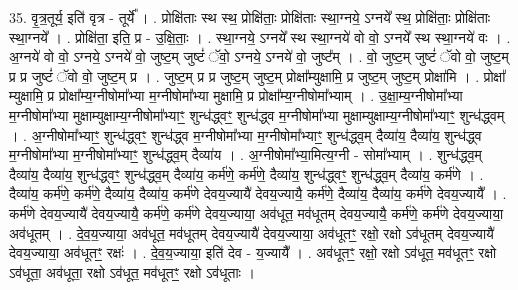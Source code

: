 \documentclass[17pt]{extarticle}
\begin{document}
35. वृ॒त्र॒तूर्य॒ इति॑ वृत्र - तूर्ये᳚ । . प्रोक्षि॑ताः स्थ स्थ॒ प्रोक्षि॑ताः॒ प्रोक्षि॑ताः स्था॒ग्नये॒ ऽग्नये᳚ स्थ॒ प्रोक्षि॑ताः॒ प्रोक्षि॑ताः स्था॒ग्नये᳚ । . प्रोक्षि॑ता॒ इति॒ प्र - उ॒क्षि॒ताः॒ । . स्था॒ग्नये॒ ऽग्नये᳚ स्थ स्था॒ग्नये॑ वो वो॒ ऽग्नये᳚ स्थ स्था॒ग्नये॑ वः । . अ॒ग्नये॑ वो वो॒ ऽग्नये॒ ऽग्नये॑ वो॒ जुष्ट॒म् जुष्टं॑ ॅवो॒ ऽग्नये॒ ऽग्नये॑ वो॒ जुष्ट᳚म् । . वो॒ जुष्ट॒म् जुष्टं॑ ॅवो वो॒ जुष्ट॒म् प्र प्र जुष्टं॑ ॅवो वो॒ जुष्ट॒म् प्र । . जुष्ट॒म् प्र प्र जुष्ट॒म् जुष्ट॒म् प्रोक्षा᳚म्युक्षामि॒ प्र जुष्ट॒म् जुष्ट॒म् प्रोक्षा॑मि । . प्रोक्षा᳚ म्युक्षामि॒ प्र प्रोक्षा᳚म्य॒ग्नीषोमा᳚भ्या म॒ग्नीषोमा᳚भ्या मुक्षामि॒ प्र प्रोक्षा᳚म्य॒ग्नीषोमा᳚भ्याम् । . उ॒क्षा॒म्य॒ग्नीषोमा᳚भ्या म॒ग्नीषोमा᳚भ्या मुक्षाम्युक्षाम्य॒ग्नीषोमा᳚भ्याꣳ॒॒ शुन्ध॑द्ध्वꣳ॒॒ 
शुन्ध॑द्ध्व म॒ग्नीषोमा᳚भ्या मुक्षाम्युक्षाम्य॒ग्नीषोमा᳚भ्याꣳ॒॒ शुन्ध॑द्ध्वम् । . अ॒ग्नीषोमा᳚भ्याꣳ॒॒ शुन्ध॑द्ध्वꣳ॒॒ शुन्ध॑द्ध्व म॒ग्नीषोमा᳚भ्या म॒ग्नीषोमा᳚भ्याꣳ॒॒ शुन्ध॑द्ध्व॒म् दैव्या॑य॒ दैव्या॑य॒ शुन्ध॑द्ध्व म॒ग्नीषोमा᳚भ्या म॒ग्नीषोमा᳚भ्याꣳ॒॒ शुन्ध॑द्ध्व॒म् दैव्या॑य । . अ॒ग्नीषोमा᳚भ्या॒मित्य॒ग्नी - सोमा᳚भ्याम् । . शुन्ध॑द्ध्व॒म् दैव्या॑य॒ दैव्या॑य॒ शुन्ध॑द्ध्वꣳ॒॒ शुन्ध॑द्ध्व॒म् दैव्या॑य॒ कर्म॑णे॒ कर्म॑णे॒ दैव्या॑य॒ शुन्ध॑द्ध्वꣳ॒॒ शुन्ध॑द्ध्व॒म् दैव्या॑य॒ कर्म॑णे । . दैव्या॑य॒ कर्म॑णे॒ कर्म॑णे॒ दैव्या॑य॒ दैव्या॑य॒ कर्म॑णे देवय॒ज्यायै॑ देवय॒ज्यायै॒ कर्म॑णे॒ दैव्या॑य॒ दैव्या॑य॒ कर्म॑णे देवय॒ज्यायै᳚ । . कर्म॑णे देवय॒ज्यायै॑ देवय॒ज्यायै॒ कर्म॑णे॒ कर्म॑णे देवय॒ज्याया॒ अव॑धूत॒ मव॑धूतम् देवय॒ज्यायै॒ कर्म॑णे॒ कर्म॑णे देवय॒ज्याया॒ अव॑धूतम् । . दे॒व॒य॒ज्याया॒ अव॑धूत॒ मव॑धूतम् देवय॒ज्यायै॑ देवय॒ज्याया॒ अव॑धूतꣳ॒॒ रक्षो॒ रक्षो ऽव॑धूतम् देवय॒ज्यायै॑ देवय॒ज्याया॒ अव॑धूतꣳ॒॒ रक्षः॑ । . दे॒व॒य॒ज्याया॒ इति॑ देव - य॒ज्यायै᳚ । . अव॑धूतꣳ॒॒ रक्षो॒ रक्षो ऽव॑धूत॒ मव॑धूतꣳ॒॒ रक्षो ऽव॑धूता॒ अव॑धूता॒ रक्षो 
ऽव॑धूत॒ मव॑धूतꣳ॒॒ रक्षो ऽव॑धूताः । \newline
\end{document}
